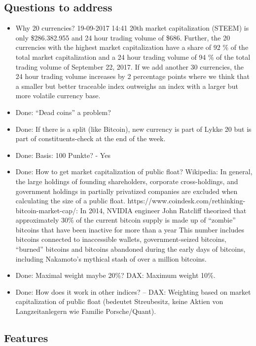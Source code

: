 \documentclass[11pt]{article}
\begin{document}
\subsection{Questions to address}
\begin{itemize}
  \item Why 20 currencies? 19-09-2017 14:41 20th market capitalization (STEEM) is only \$286.382.955 and 24 hour trading volume of \$686. Further, the 20 currencies with the highest market capitalization have a share of 92 \% of the total market capitalization and a 24 hour trading volume of 94 \% of the total trading volume of September 22, 2017. If we add another 30 currencies, the 24 hour trading volume increases by 2 percentage points where we think that a smaller but better traceable index outweighs an index with a larger but more volatile currency base.
  \item Done: ``Dead coins'' a problem?
  \item Done: If there is a split (like Bitcoin), new currency is part of Lykke 20 but is part of constituents-check at the end of the week.
  \item Done: Basis: 100 Punkte? - Yes
  \item Done: How to get market capitalization of public float? Wikipedia:  In general, the large holdings of founding shareholders, corporate cross-holdings, and government holdings in partially privatized companies are excluded when calculating the size of a public float. https://www.coindesk.com/rethinking-bitcoin-market-cap/: In 2014, NVIDIA engineer John Ratcliff theorized that approximately 30\% of the current bitcoin supply is made up of ``zombie'' bitcoins that have been inactive for more than a year This number includes bitcoins connected to inaccessible wallets, government-seized bitcoins, ``burned'' bitcoins and bitcoins abandoned during the early days of bitcoins, including Nakamoto's mythical stash of over a million bitcoins.
  \item Done: Maximal weight maybe 20\%? DAX: Maximum weight 10\%.
  \item Done: How does it work in other indices? -- DAX: Weighting based on market capitalization of public float (bedeutet Streubesitz, keine Aktien von Langzeitanlegern  wie Familie Porsche/Quant).
\end{itemize}


\subsection{Features}
\end{document}
